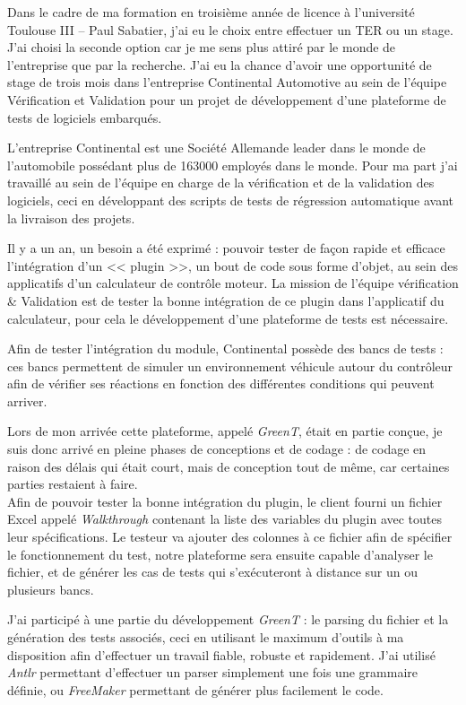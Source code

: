 \documentclass[a4paper, 12pt]{article}
\begin{document}
	\maketitle
	Dans le cadre de ma formation en troisième année de licence à l'université Toulouse III -- Paul Sabatier, j'ai eu le choix entre effectuer un TER ou un
	stage.  J'ai choisi la seconde option car je me sens plus attiré par le monde de l'entreprise que par la recherche. J'ai eu la chance d’avoir une opportunité de stage de trois mois dans l'entreprise Continental Automotive au sein de l'équipe Vérification et Validation pour un projet de développement
	d'une plateforme de tests de logiciels embarqués.

	L'entreprise Continental est une Société Allemande leader dans le monde de l'automobile possédant plus de 163000 employés dans le monde. Pour ma part j'ai travaillé au
	sein de l'équipe en charge de la vérification et de la validation des logiciels, ceci en développant des scripts de tests de régression automatique avant la
	livraison des projets.

	Il y a un an, un besoin a été exprimé : pouvoir tester de façon rapide et efficace l'intégration d'un << plugin >>, un bout de code sous forme
	d'objet,  au sein des applicatifs d'un calculateur de contrôle moteur. La mission de l'équipe vérification \& Validation est de tester la bonne intégration
	de ce plugin dans l'applicatif du calculateur, pour cela le développement d'une plateforme de tests est nécessaire.

	Afin de tester l'intégration du module, Continental possède des bancs de tests : ces bancs permettent de simuler un environnement véhicule autour du
	contrôleur afin de vérifier ses réactions en fonction des différentes conditions qui peuvent arriver.

	Lors de mon arrivée cette plateforme, appelé \textit{GreenT}, était en partie conçue, je suis donc arrivé en pleine phases de conceptions et de codage : de
	codage en raison des délais qui était court, mais de conception tout de même, car certaines parties restaient à faire.\\
	Afin de pouvoir tester la bonne intégration du plugin, le client fourni un fichier Excel appelé \textit{Walkthrough} contenant la liste des variables du plugin avec
	toutes leur spécifications. Le testeur va ajouter des colonnes à ce fichier afin de spécifier le fonctionnement du test, notre plateforme sera ensuite
	capable d'analyser le fichier, et de générer les cas de tests qui s'exécuteront à distance sur un ou plusieurs bancs.

	J'ai participé à une partie du développement \textit{GreenT} : le parsing du fichier et la génération des tests associés, ceci en utilisant le maximum d'outils à ma
	disposition afin d'effectuer un travail fiable, robuste et rapidement. J'ai utilisé \textit{Antlr} permettant d'effectuer un parser simplement une fois
	une grammaire définie, ou \textit{FreeMaker} permettant de générer plus facilement le code.
\end{document}
